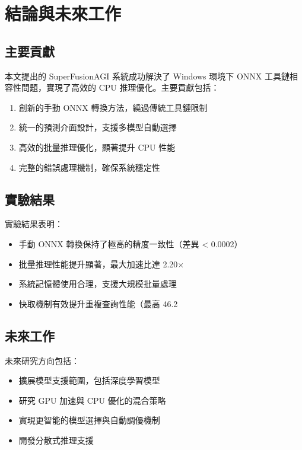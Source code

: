 \documentclass[11pt,a4paper]{article}
\begin{document}
\section{結論與未來工作}

\subsection{主要貢獻}

本文提出的 SuperFusionAGI 系統成功解決了 Windows 環境下 ONNX 工具鏈相容性問題，實現了高效的 CPU 推理優化。主要貢獻包括：

\begin{enumerate}
    \item 創新的手動 ONNX 轉換方法，繞過傳統工具鏈限制
    \item 統一的預測介面設計，支援多模型自動選擇
    \item 高效的批量推理優化，顯著提升 CPU 性能
    \item 完整的錯誤處理機制，確保系統穩定性
\end{enumerate}

\subsection{實驗結果}

實驗結果表明：

\begin{itemize}
    \item 手動 ONNX 轉換保持了極高的精度一致性（差異 < 0.0002）
    \item 批量推理性能提升顯著，最大加速比達 2.20×
    \item 系統記憶體使用合理，支援大規模批量處理
    \item 快取機制有效提升重複查詢性能（最高 46.2%
\end{itemize}

\subsection{未來工作}

未來研究方向包括：

\begin{itemize}
    \item 擴展模型支援範圍，包括深度學習模型
    \item 研究 GPU 加速與 CPU 優化的混合策略
    \item 實現更智能的模型選擇與自動調優機制
    \item 開發分散式推理支援
\end{itemize}
\end{document}

